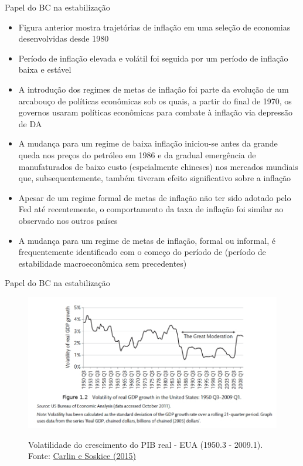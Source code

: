 \documentclass[10pt]{beamer}
\begin{document}
\begin{frame}
    {Papel do BC na estabilização}
    \begin{itemize}
        \item Figura anterior mostra trajetórias de inflação em uma seleção de economias desenvolvidas desde 1980\bigskip
        \item Período de inflação elevada e volátil foi seguida por um período de inflação baixa e estável\bigskip
        \item A introdução dos regimes de metas de inflação foi parte da evolução de um arcabouço de políticas econômicas sob os quais, a partir do final de 1970, os governos usaram políticas econômicas para combate à inflação via depressão de DA\bigskip
        \item A mudança para um regime de baixa inflação iniciou-se antes da grande queda nos preços do petróleo em 1986 e da gradual emergência de manufaturados de baixo custo (espcialmente chineses) nos mercados mundiais que, subsequentemente, também tiveram efeito significativo sobre a inflação
    \end{itemize}
\end{frame}

\begin{frame}
    \begin{itemize}
        \item Apesar de um regime formal de metas de inflação não ter sido adotado pelo Fed até recentemente, o comportamento da taxa de inflação foi similar ao observado nos outros países\bigskip
        \item A mudança para um regime de metas de inflação, formal ou informal, é frequentemente identificado com o começo do período de  (período de estabilidade macroeconômica sem precedentes)
    \end{itemize}
\end{frame}

\begin{frame}
    {Papel do BC na estabilização}
    \begin{figure}
        \href{https://bookdown.org/robohay/economicsnotes/Figures/Demand/gtmoderation.jpg}{\includegraphics[width=.8\textwidth]{./figures/aula15_fig7.jpg}}
        \caption{Volatilidade do crescimento do PIB real - EUA (1950.3 - 2009.1). Fonte: \href{https://bookdown.org/robohay/economicsnotes/Figures/Demand/gtmoderation.jpg}{Carlin e Soskice (2015)}}
    \end{figure}
\end{frame}
\end{document}
